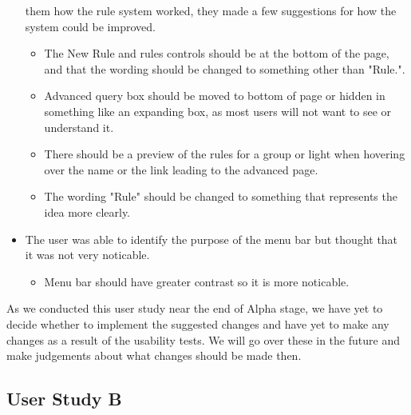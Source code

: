 \documentclass[oneside,openright]{book}
\begin{document}
\begin{itemize}
        them how the rule system worked, they made a few suggestions for how
        the system could be improved.
        \begin{itemize}
            \item The New Rule and rules controls should be at the bottom of
                the page, and that the wording should be changed to something
                other than "Rule.".
            \item Advanced query box should be moved to bottom of page or
                hidden in something like an expanding box, as most users will
                not want to see or understand it.
            \item There should be a preview of the rules for a group or light
                when hovering over the name or the link leading to the advanced
                page.
            \item The wording "Rule" should be changed to something that
                represents the idea more clearly.
        \end{itemize}
    \item The user was able to identify the purpose of the menu bar but thought
        that it was not very noticable.
        \begin{itemize}
            \item Menu bar should have greater contrast so it is more
                noticable.
        \end{itemize}
\end{itemize}

As we conducted this user study near the end of Alpha stage, we have yet to
decide whether to implement the suggested changes and have yet to make any
changes as a result of the usability tests. We will go over these in the future
and make judgements about what changes should be made then.

\subsection{User Study B}
\end{document}
